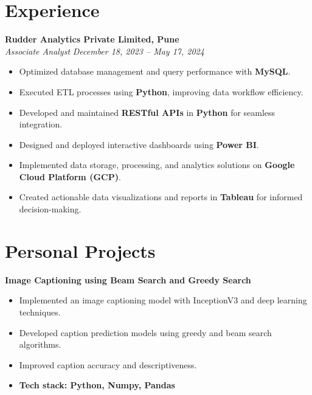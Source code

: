 \documentclass[a4paper,11pt]{article}
\begin{document}
\section{\textbf{Experience}}
\noindent
\textbf{Rudder Analytics Private Limited, Pune} \\
\textit{Associate Analyst} \hspace{9.2cm} \textit{December 18, 2023 – May 17, 2024} \\
\vspace{-3mm}
\begin{itemize}[left=0pt, label={\textbullet}, labelsep=1em, itemsep=0mm, noitemsep]
  \item Optimized database management and query performance with \textbf{MySQL}.
  \item Executed ETL processes using \textbf{Python}, improving data workflow efficiency.
  \item Developed and maintained \textbf{RESTful APIs} in \textbf{Python} for seamless integration.
  \item Designed and deployed interactive dashboards using \textbf{Power BI}.
  \item Implemented data storage, processing, and analytics solutions on \textbf{Google Cloud Platform (GCP)}.
  \item Created actionable data visualizations and reports in \textbf{Tableau} for informed decision-making.
\end{itemize}
\vspace{-6mm}



\section{\textbf{Personal Projects}}
\noindent
\textbf{Image Captioning using Beam Search and Greedy Search} \\
\vspace{-3mm}
\begin{itemize}[left=0pt, label={\textbullet}, labelsep=1em, itemsep=0mm, noitemsep]
  \item Implemented an image captioning model with InceptionV3 and deep learning techniques.
  \item Developed caption prediction models using greedy and beam search algorithms.
  \item Improved caption accuracy and descriptiveness.
  \item \textbf{Tech stack: Python, Numpy, Pandas}
\end{itemize}
\end{document}
